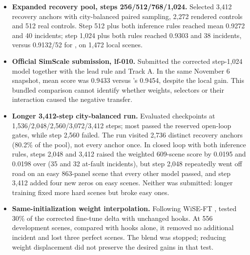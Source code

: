 \begin{itemize}
\item \textbf{Expanded recovery pool, steps 256/512/768/1,024.} Selected 3,412 recovery anchors with city-balanced paired sampling, 2,272 rendered controls and 512 real controls. Step 512 plus both inference rules reached mean 0.9272 and 40 incidents; step 1,024 plus both rules reached 0.9303 and 38 incidents, versus 0.9132/52 for \lf{}, on 1,472 local scenes.
\item \textbf{Official SimScale submission, lf-010.} Submitted the corrected step-1,024 model together with the lead rule and Track A. In the same November 6 snapshot, mean score was 0.9433 versus \lf{}'s 0.9454, despite the local gain. This bundled comparison cannot identify whether weights, selectors or their interaction caused the negative transfer.
\item \textbf{Longer 3,412-step city-balanced run.} Evaluated checkpoints at 1,536/2,048/2,560/3,072/3,412 steps; most passed the reserved open-loop gates, while step 2,560 failed. The run visited 2,736 distinct recovery anchors (80.2\% of the pool), not every anchor once. In closed loop with both inference rules, steps 2,048 and 3,412 raised the weighted 609-scene score by 0.0195 and 0.0198 over \lf{} (35 and 32 at-fault incidents), but step 2,048 repeatedly went off road on an easy 863-panel scene that every other model passed, and step 3,412 added four new zeros on easy scenes. Neither was submitted: longer training fixed more hard scenes but broke easy ones.
\item \textbf{Same-initialization weight interpolation.} Following WiSE-FT \cite{wiseft}, tested 30\% of the corrected fine-tune delta with unchanged hooks. At 556 development scenes, compared with hooks alone, it removed no additional incident and lost three perfect scenes. The blend was stopped; reducing weight displacement did not preserve the desired gains in that test.
\end{itemize}

